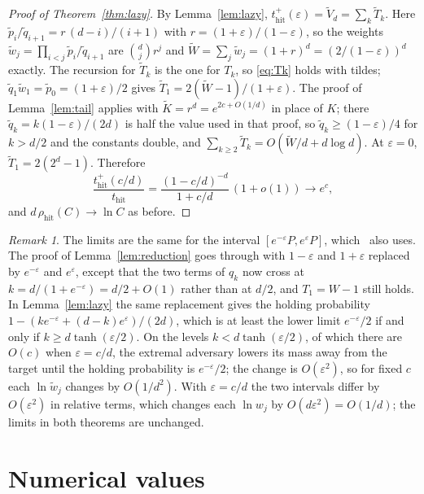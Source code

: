 \documentclass[11pt]{amsart}
\theoremstyle{remark}
\newtheorem{remark}[theorem]{Remark}
\newcommand{\eps}{\varepsilon}
\newcommand{\thit}{t_{\mathrm{hit}}}
\newcommand{\rhit}{\rho_{\mathrm{hit}}}
\begin{document}
\begin{proof}[Proof of Theorem~\ref{thm:lazy}]
By Lemma~\ref{lem:lazy}, $\thit^+(\eps)=\tilde V_d=\sum_k\tilde T_k$. Here $\tilde p_i/\tilde q_{i+1}=r\,(d-i)/(i+1)$
with $r=(1+\eps)/(1-\eps)$, so the weights $\tilde w_j=\prod_{i<j}\tilde p_i/\tilde q_{i+1}$ are $\binom djr^j$ and
$\tilde W=\sum_j\tilde w_j=(1+r)^d=(2/(1-\eps))^d$ exactly. The recursion for $\tilde T_k$ is the one for $T_k$, so
\eqref{eq:Tk} holds with tildes; $\tilde q_1\tilde w_1=\tilde p_0=(1+\eps)/2$ gives $\tilde T_1=2(\tilde W-1)/(1+\eps)$.
The proof of Lemma~\ref{lem:tail} applies with $\tilde K=r^d=e^{2c+O(1/d)}$ in place of $K$; there
$\tilde q_k=k(1-\eps)/(2d)$ is half the value used in that proof, so $\tilde q_k\ge(1-\eps)/4$ for $k>d/2$ and the
constants double, and $\sum_{k\ge2}\tilde T_k=O(\tilde W/d+d\log d)$. At $\eps=0$, $\tilde T_1=2(2^d-1)$. Therefore
\[
\frac{\thit^+(c/d)}{\thit}=\frac{(1-c/d)^{-d}}{1+c/d}\,(1+o(1))\to e^{c},
\]
and $d\,\rhit(C)\to\ln C$ as before.
\end{proof}

\begin{remark}
The limits are the same for the interval $[e^{-\eps}P,e^{\eps}P]$, which~\cite[Section~1.1]{Zuc26} also uses. The proof
of Lemma~\ref{lem:reduction} goes through with $1-\eps$ and $1+\eps$ replaced by $e^{-\eps}$ and
$e^{\eps}$, except that the two terms of $q_k$ now cross at $k=d/(1+e^{-\eps})=d/2+O(1)$ rather than at $d/2$, and
$T_1=W-1$ still holds. In Lemma~\ref{lem:lazy} the same replacement gives the holding probability $1-(ke^{-\eps}+(d-k)e^{\eps})/(2d)$, which is at least the lower limit $e^{-\eps}/2$ if and only if $k\ge d\tanh(\eps/2)$. On the levels $k<d\tanh(\eps/2)$, of which there are $O(c)$ when $\eps=c/d$, the extremal adversary lowers its mass away from the target until the holding probability is $e^{-\eps}/2$; the change is $O(\eps^2)$, so for fixed $c$ each $\ln\tilde w_j$ changes by $O(1/d^2)$. With
$\eps=c/d$ the two intervals differ by $O(\eps^2)$ in relative terms, which changes each $\ln w_j$ by $O(d\eps^2)=O(1/d)$; the limits in both theorems are unchanged.
\end{remark}

\section{Numerical values}\label{sec:checks}
\end{document}
